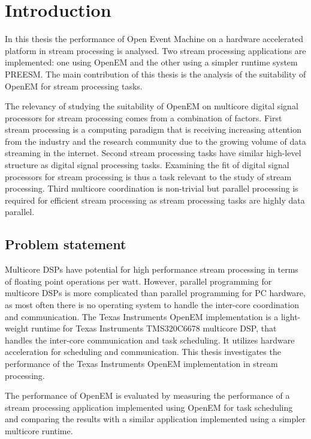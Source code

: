 \chapter{Introduction}
\label{chapter:introduction}
In this thesis the performance of Open Event Machine on a hardware accelerated platform in stream processing is analysed. Two stream processing applications are implemented: one using OpenEM and the other using a simpler runtime system PREESM. The main contribution of this thesis is the analysis of the suitability of OpenEM for stream processing tasks.

The relevancy of studying the suitability of OpenEM on multicore digital signal processors for stream processing comes from a combination of factors. First stream processing is a computing paradigm that is receiving increasing attention from the industry and the research community due to the growing volume of data streaming in the internet. Second stream processing tasks have similar high-level structure as digital signal processing tasks. Examining the fit of digital signal processors for stream processing is thus a task relevant to the study of stream processing. Third multicore coordination is non-trivial but parallel processing is required for efficient stream processing as stream processing tasks are highly data parallel.

\section{Problem statement}
\label{section:problem-statement}
Multicore DSPs have potential for high performance stream processing in terms of floating point operations per watt. However, parallel programming for multicore DSPs is more complicated than parallel programming for PC hardware, as most often there is no operating system to handle the inter-core coordination and communication. The Texas Instruments OpenEM implementation is a light-weight runtime for Texas Instruments TMS320C6678 multicore DSP, that handles the inter-core communication and task scheduling. It utilizes hardware acceleration for scheduling and communication. This thesis investigates the performance of the Texas Instruments OpenEM implementation in stream processing.

The performance of OpenEM is evaluated by measuring the performance of a stream processing application implemented using OpenEM for task scheduling and comparing the results with a similar application implemented using a simpler multicore runtime.


